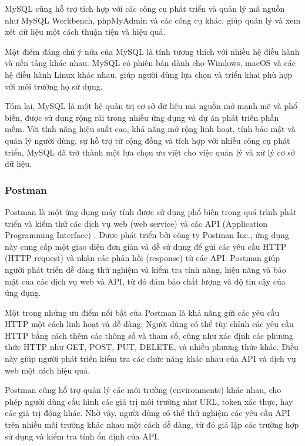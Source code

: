 MySQL cũng hỗ trợ tích hợp với các công cụ phát triển và quản lý mã nguồn như MySQL Workbench, phpMyAdmin và các công cụ khác, giúp quản lý và xem xét dữ liệu một cách thuận tiện và hiệu quả.

Một điểm đáng chú ý nữa của MySQL là tính tương thích với nhiều hệ điều hành và nền tảng khác nhau. MySQL có phiên bản dành cho Windows, macOS và các hệ điều hành Linux khác nhau, giúp người dùng lựa chọn và triển khai phù hợp với môi trường họ sử dụng.

Tóm lại, MySQL là một hệ quản trị cơ sở dữ liệu mã nguồn mở mạnh mẽ và phổ biến, được sử dụng rộng rãi trong nhiều ứng dụng và dự án phát triển phần mềm. Với tính năng hiệu suất cao, khả năng mở rộng linh hoạt, tính bảo mật và quản lý người dùng, sự hỗ trợ từ cộng đồng và tích hợp với nhiều công cụ phát triển, MySQL đã trở thành một lựa chọn ưu việt cho việc quản lý và xử lý cơ sở dữ liệu.


\subsubsection{Postman}
\mbox{}

Postman là một ứng dụng máy tính được sử dụng phổ biến trong quá trình phát triển và kiểm thử các dịch vụ web (web service) và các API (Application Programming Interface) \cite{postman_1}. Được phát triển bởi công ty Postman Inc., ứng dụng này cung cấp một giao diện đơn giản và dễ sử dụng để gửi các yêu cầu HTTP (HTTP request) và nhận các phản hồi (response) từ các API. Postman giúp người phát triển dễ dàng thử nghiệm và kiểm tra tính năng, hiệu năng và bảo mật của các dịch vụ web và API, từ đó đảm bảo chất lượng và độ tin cậy của ứng dụng.

Một trong những ưu điểm nổi bật của Postman là khả năng gửi các yêu cầu HTTP một cách linh hoạt và dễ dàng. Người dùng có thể tùy chỉnh các yêu cầu HTTP bằng cách thêm các thông số và tham số, cũng như xác định các phương thức HTTP như GET, POST, PUT, DELETE, và nhiều phương thức khác. Điều này giúp người phát triển kiểm tra các chức năng khác nhau của API và dịch vụ web một cách hiệu quả.

Postman cũng hỗ trợ quản lý các môi trường (environments) khác nhau, cho phép người dùng cấu hình các giá trị môi trường như URL, token xác thực, hay các giá trị động khác. Nhờ vậy, người dùng có thể thử nghiệm các yêu cầu API trên nhiều môi trường khác nhau một cách dễ dàng, từ đó giả lập các trường hợp sử dụng và kiểm tra tính ổn định của API.

